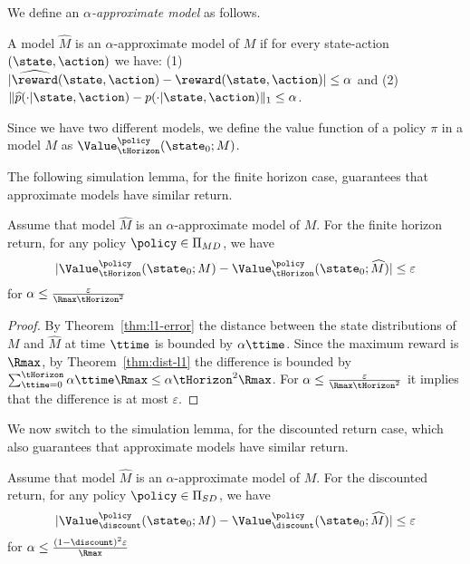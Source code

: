 We define an {\em $\alpha$-approximate model} as follows.
%
\begin{definition}
A model $\widehat{M}$ is an $\alpha$-approximate model of $M$
if for every state-action $(\state,\action)$ we have: (1)
$|\widehat{\reward}(\state,\action)-\reward(\state,\action)|\leq
\alpha$ and (2)
$\|\widehat{p}(\cdot|\state,\action)-p(\cdot|\state,\action)\|_1\leq\alpha$.
\end{definition}

Since we have two different models, we define the value function of a policy $\pi$ in a model $M$ as $\Value^\policy_\tHorizon(\state_0;M)$.

The following simulation lemma, for the finite horizon case,
guarantees that approximate models have similar return.

\begin{lemma}
\label{lemma:approx-model-FH}
%
%
Assume that model $\widehat{M}$ is an $\alpha$-approximate model of
$M$. For the finite horizon return, for any policy $\policy \in
 {\Pi _{MD}}$, we have
\[
|\Value^\policy_\tHorizon(\state_0;M)-\Value^\policy_\tHorizon(\state_0;\widehat{M})|\leq
\varepsilon
\]
for $\alpha\leq \frac{\varepsilon}{\Rmax \tHorizon^2}$
\end{lemma}

\begin{proof}
By Theorem~\ref{thm:l1-error} the distance between the state
distributions of $M$ and $\widehat{M}$ at time $\ttime$ is bounded
by $\alpha\ttime$. Since the maximum reward  is $\Rmax$, by
Theorem~\ref{thm:dist-l1} the difference is bounded by
$\sum_{\ttime=0}^\tHorizon \alpha\ttime \Rmax\leq \alpha\tHorizon^2
\Rmax$. For $\alpha\leq \frac{\varepsilon}{\Rmax \tHorizon^2}$ it
implies that the difference is at most $\varepsilon$.
\end{proof}


We now switch to the simulation lemma, for the discounted return
case, which also guarantees that approximate models have similar
return.

\begin{lemma}
\label{lemma:approx-model-dic}
%
Assume that model $\widehat{M}$ is an $\alpha$-approximate model of $M$. For the discounted return, for any policy $\policy \in  {\Pi_{SD}}$, we have
\[
|\Value^\policy_\discount(\state_0;M)-\Value^\policy_\discount(\state_0;\widehat{M})|\leq
\varepsilon
\]
for $\alpha\leq \frac{(1-\discount)^2\varepsilon}{\Rmax}$
\end{lemma}

